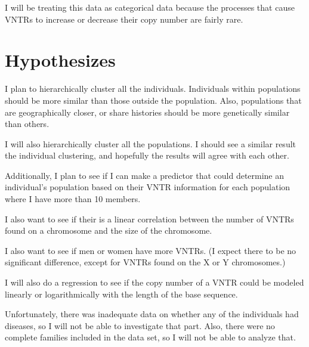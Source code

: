 \documentclass[]{article}
\begin{document}
I will be treating this data as categorical data because the processes that cause VNTRs to increase or decrease their copy number are fairly rare. 

\section{Hypothesizes}
I plan to hierarchically cluster all the individuals. Individuals within populations should be more similar than those outside the population. Also, populations that are geographically closer, or share histories should be more genetically similar than others.

I will also hierarchically cluster all the populations. I should see a similar result the individual clustering, and hopefully the results will agree with each other.  

Additionally, I plan to see if I can make a predictor that could determine an individual's population based on their VNTR information for each population where I have more than 10 members. 

I also want to see if their is a linear correlation between the number of VNTRs found on a chromosome and the size of the chromosome.

I also want to see if men or women have more VNTRs. (I expect there to be no significant difference, except for VNTRs found on the X or Y chromosomes.)

I will also do a regression to see if the copy number of a VNTR could be modeled linearly or logarithmically with the length of the base sequence. 

Unfortunately, there was inadequate data on whether any of the individuals had diseases, so I will not be able to investigate that part. Also, there were no complete families included in the data set, so I will not be able to analyze that.  
\end{document}
